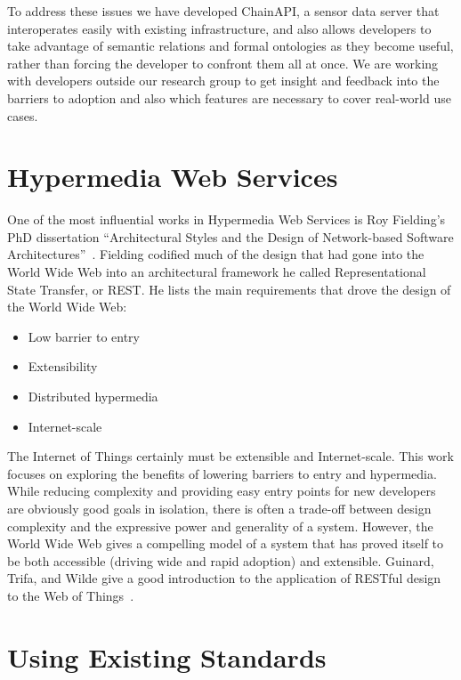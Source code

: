 \documentclass{acm_proc_article-sp}
\newenvironment{tightitemize}{
    \vspace{-10pt}
    \begin{itemize}
        \setlength{\parskip}{-1pt}}{
    \end{itemize}
    \vspace{-10pt}}
\begin{document}
To address these issues we have developed ChainAPI, a sensor data server that
interoperates easily with existing infrastructure, and also allows developers
to take advantage of semantic relations and formal ontologies as they become
useful, rather than forcing the developer to confront them all at once. We are
working with developers outside our research group to get insight and feedback
into the barriers to adoption and also which features are necessary to cover
real-world use cases.

\section{Hypermedia Web Services}

One of the most influential works in Hypermedia Web Services is Roy Fielding's
PhD dissertation ``Architectural Styles and the Design of Network-based
Software Architectures''~\cite{fielding}. Fielding codified much of the design
that had gone into the World Wide Web into an architectural framework he called
Representational State Transfer, or REST. He lists the main requirements that
drove the design of the World Wide Web:

\begin{tightitemize}
    \item Low barrier to entry
    \item Extensibility
    \item Distributed hypermedia
    \item Internet-scale
\end{tightitemize}

The Internet of Things certainly must be extensible and Internet-scale. This
work focuses on exploring the benefits of lowering barriers to entry and
hypermedia. While reducing complexity and providing easy entry points for new
developers are obviously good goals in isolation, there is often a trade-off
between design complexity and the expressive power and generality of a system.
However, the World Wide Web gives a compelling model of a system that has
proved itself to be both accessible (driving wide and rapid adoption) and
extensible. Guinard, Trifa, and Wilde give a good introduction to the
application of RESTful design to the Web of Things~\cite{guinard2010}.

\section{Using Existing Standards}
\end{document}
